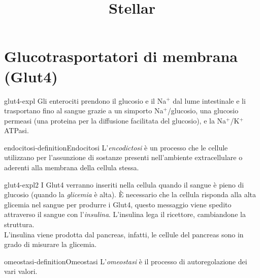 \documentclass[preview]{standalone}
\begin{document}
\title{Stellar}
\genpage

\section{Glucotrasportatori di membrana (Glut4)}

\begin{snippet}{glut4-expl}
    Gli enterociti prendono il glucosio e il Na\({}^+\) dal lume intestinale
e li trasportano fino al sangue grazie a un simporto Na\({}^+\)/glucosio, una glucosio permeasi
(una proteina per la diffusione facilitata del glucosio), e la Na\({}^+\)/K\({}^+\)ATPasi. 
\end{snippet}

\begin{snippetdefinition}{endocitosi-definition}{Endocitosi}
    L'\textit{encodictosi} è un processo che le cellule utilizzano per l'assunzione di sostanze presenti nell'ambiente extracellulare o aderenti alla membrana della cellula stessa.
\end{snippetdefinition}


\begin{snippet}{glut4-expl2}
    I Glut4 verranno inseriti nella cellula quando il sangue è pieno di glucosio (quando la \textit{glicemia} è alta).
È necessario che la cellula risponda alla alta glicemia nel sangue per produrre i Glut4,
questo messaggio viene spedito attraverso il sangue con l'\textit{insulina}.
L'insulina lega il ricettore, cambiandone la struttura. \\
L'insulina viene prodotta dal pancreas, infatti, le cellule del pancreas sono in grado di misurare la glicemia.
\end{snippet}



\begin{snippetdefinition}{omeostasi-definition}{Omeostasi}
    L'\textit{omeostasi} è il processo di autoregolazione dei vari valori.
\end{snippetdefinition}


\end{document}
